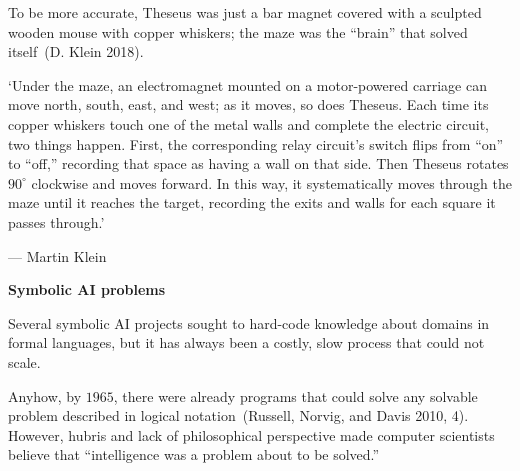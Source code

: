 \documentclass[
  letterpaper,
  12pt,
  british]{tufte-book}
\renewenvironment{quote}{
  \list{}{\leftmargin=3.5cm\topsep=0pt}
  \item\relax\small\itshape
}
{\endlist}
\theoremstyle{plain}
\theoremstyle{definition}
\theoremstyle{plain}
\theoremstyle{remark}
\begin{document}
To be more accurate, Theseus was just a bar magnet covered with a
sculpted wooden mouse with copper whiskers; the maze was the ``brain''
that solved itself~(D. Klein
2018).

\begin{quote}
`Under the maze, an electromagnet mounted on a motor-­powered carriage
can move north, south, east, and west; as it moves, so does Theseus.
Each time its copper whiskers touch one of the metal walls and complete
the electric circuit, two things happen. First, the corresponding relay
circuit's switch flips from ``on'' to ``off,'' recording that space as
having a wall on that side. Then Theseus rotates \(90^{\circ}\)
clockwise and moves forward. In this way, it systematically moves
through the maze until it reaches the target, recording the exits and
walls for each square it passes through.'

--- Martin Klein
\end{quote}

\textbf{Symbolic AI problems}

Several symbolic AI projects sought to hard-code knowledge about domains
in formal languages, but it has always been a costly, slow process that
could not scale.

Anyhow, by \(1965\), there were already programs that could solve any
solvable problem described in logical notation~(Russell, Norvig, and
Davis 2010,
4).
However, hubris and lack of philosophical perspective made computer
scientists believe that ``intelligence was a problem about to be
solved.''
\end{document}

